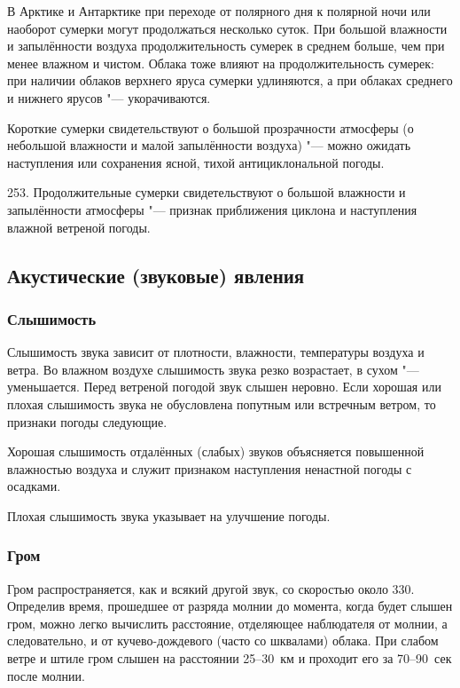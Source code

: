 В Арктике и Антарктике при переходе от полярного дня к полярной ночи
или наоборот сумерки могут продолжаться несколько суток. При большой
влажности и запылённости воздуха продолжительность сумерек в среднем
больше, чем при менее влажном и чистом. Облака тоже влияют на
продолжительность сумерек: при наличии облаков верхнего яруса сумерки
удлиняются, а при облаках среднего и нижнего ярусов "--- укорачиваются.

 Короткие сумерки свидетельствуют о большой прозрачности
атмосферы (о небольшой влажности и малой запылённости воздуха) "--- можно
ожидать наступления или сохранения ясной, тихой антициклональной
погоды.

253. Продолжительные сумерки свидетельствуют о большой влажности и
запылённости атмосферы "--- признак приближения циклона и наступления
влажной ветреной погоды.

\subsection{Акустические (звуковые) явления}

\subsubsection{Слышимость}

Слышимость звука зависит от плотности, влажности, температуры воздуха
и ветра. Во влажном воздухе слышимость звука резко возрастает, в сухом
"--- уменьшается. Перед ветреной погодой звук слышен неровно. Если
хорошая или плохая слышимость звука не обусловлена попутным или
встречным ветром, то признаки погоды следующие.

 Хорошая слышимость отдалённых (слабых) звуков объясняется
повышенной влажностью воздуха и служит признаком наступления ненастной
погоды с осадками.

 Плохая слышимость звука указывает на улучшение погоды.

\subsubsection{Гром}

Гром распространяется, как и всякий другой звук, со скоростью около
330\speedms. Определив время, прошедшее от разряда молнии до момента,
когда будет слышен гром, можно легко вычислить расстояние, отделяющее
наблюдателя от молнии, а следовательно, и от кучево-дождевого (часто
со шквалами) облака. При слабом ветре и штиле гром слышен на
расстоянии 25--30~км и проходит его за 70--90~сек после молнии.

